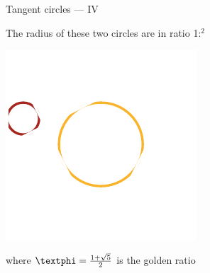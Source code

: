 \documentclass[14pt]{beamer}
\begin{document}

    \begin{frame}{Tangent circles --- IV}
        \begin{center}
            The radius of these two circles are in ratio 1:\textphi$^2$
        \end{center}\medskip
        \hspace{6.18em} \includegraphics[scale=1.0]{figures/figure019h.pdf} \\
        \begin{center}
             where $\text{\textphi} =\tfrac{1+\sqrt{5}}{2}$ is the golden ratio
        \end{center}
    \end{frame}

\end{document}
